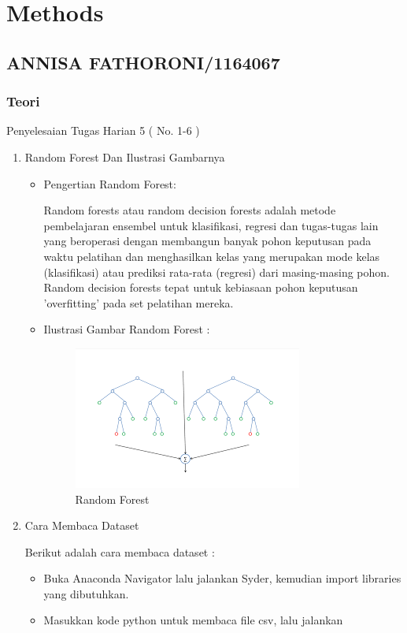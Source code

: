 \chapter{Methods}

\section{ANNISA FATHORONI/1164067}
\subsection{Teori}
Penyelesaian Tugas Harian 5 ( No. 1-6 )
\begin{enumerate}
\item Random Forest Dan Ilustrasi Gambarnya
\begin{itemize}
\item Pengertian Random Forest:

Random forests atau random decision forests adalah metode pembelajaran ensembel untuk klasifikasi, regresi dan tugas-tugas lain yang beroperasi dengan membangun banyak pohon keputusan pada waktu pelatihan dan menghasilkan kelas yang merupakan mode kelas (klasifikasi) atau prediksi rata-rata (regresi) dari masing-masing pohon. Random decision forests tepat untuk kebiasaan pohon keputusan 'overfitting' pada set pelatihan mereka.

\item Ilustrasi Gambar Random Forest :

\begin{figure}[ht]
\centering
\includegraphics[scale=0.5]{figures/Chapter3AnnisaFathoroni1.png}
\caption{Random Forest}
\label{contoh}
\end{figure}

\end{itemize}

\item Cara Membaca Dataset

Berikut adalah cara membaca dataset :
\begin{itemize}
\item Buka Anaconda Navigator lalu jalankan Syder, kemudian import libraries yang dibutuhkan.
\item Masukkan kode python untuk membaca file csv, lalu jalankan


\end{itemize}
\end{enumerate}
